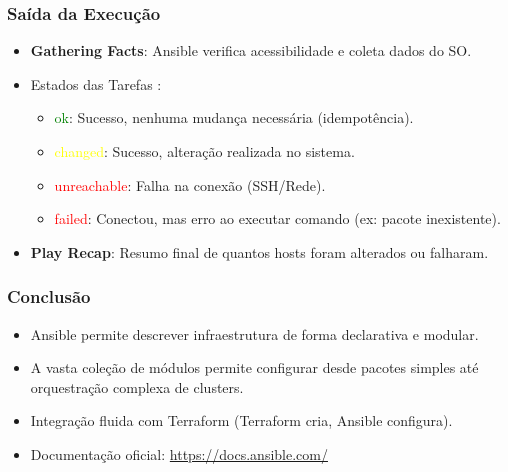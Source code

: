 \documentclass{beamer}
\begin{document}
   \begin{frame}
      \frametitle{Saída da Execução}
      \begin{itemize}
      \item \textbf{Gathering Facts}: Ansible verifica acessibilidade e coleta dados do SO.
      \item Estados das Tarefas :
      \begin{itemize}
      \item \textcolor{green}{ok}: Sucesso, nenhuma mudança necessária (idempotência).
      \item \textcolor{yellow}{changed}: Sucesso, alteração realizada no sistema.
      \item \textcolor{red}{unreachable}: Falha na conexão (SSH/Rede).
      \item \textcolor{red}{failed}: Conectou, mas erro ao executar comando (ex: pacote inexistente).
      \end{itemize}
      \item \textbf{Play Recap}: Resumo final de quantos hosts foram alterados ou falharam.
      \end{itemize}
   \end{frame}

   \begin{frame}
      \frametitle{Conclusão}
      \begin{itemize}
      \item Ansible permite descrever infraestrutura de forma declarativa e modular.
      \item A vasta coleção de módulos permite configurar desde pacotes simples até orquestração complexa de clusters.
      \item Integração fluida com Terraform (Terraform cria, Ansible configura).
      \item Documentação oficial: \url{https://docs.ansible.com/}
      \end{itemize}
   \end{frame}
\end{document}
